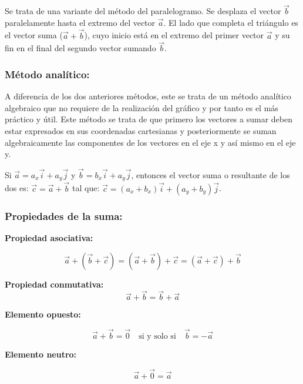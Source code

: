 Se trata de una variante del método del paralelogramo. Se desplaza el vector $\vec{b}$ paralelamente hasta el extremo 
del vector $\vec{a}$. El lado que completa el triángulo es el vector suma ($\vec{a} + \vec{b}$), cuyo inicio está en el 
extremo del primer vector $\vec{a}$ y su fin en el final del segundo vector sumando $\vec{b}$. 
    
\subsubsection{Método analítico:}     

A diferencia de los dos anteriores métodos, este se trata de un método analítico algebraico que no requiere de la 
realización del gráfico y por tanto es el más práctico y útil. Este método se trata de que primero los vectores a sumar 
deben estar expresados en sus coordenadas cartesianas y posteriormente se suman algebraicamente las componentes de los 
vectores en el eje x y así mismo en el eje y.

\begin{tcolorbox}
 Si $\vec{a} = a_x\vec{i}+a_y\vec{j}$ y $\vec{b} = b_x\vec{i}+a_y\vec{j}$, entonces el vector suma o resultante de los 
dos es: $\vec{c} =\vec{a}+\vec{b}$ tal que: $\vec{c} = (a_x + b_x)\vec{i} +(a_y+b_y)\vec{j}$. 
\end{tcolorbox}

\subsubsection{Propiedades de la suma:}

\textbf{Propiedad asociativa:}

\begin{equation}
 \vec{a} + (\vec{b} + \vec{c}) = (\vec{a} + \vec{b}) + \vec{c} = (\vec{a} + \vec{c}) +\vec{b} 
 \end{equation}

\textbf{Propiedad conmutativa:}
\begin{equation}
 \vec{a} + \vec{b} = \vec{b} + \vec{a}
\end{equation}

\textbf{Elemento opuesto:}

\begin{equation}
 \vec{a} + \vec{b} = \vec{0} \quad \text{si y solo si}\quad \vec{b} =-\vec{a} 
\end{equation}

\textbf{Elemento neutro:}

\begin{equation}
 \vec{a} + \vec{0} = \vec{a} 
\end{equation}

